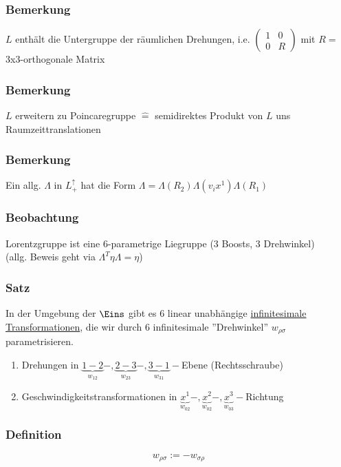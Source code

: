 \documentclass[twoside,a4paper]{scrartcl}
\renewcommand{\1}{\mathds{1}}
\newcommand{\entspricht}{\mathrel{\widehat{=}}}
\renewcommand{\L}{\Lambda}
\begin{document}
\subsubsection*{Bemerkung}
$L$ enthält die Untergruppe der räumlichen Drehungen, i.e. $\begin{pmatrix}1 & 0\\ 0 & R\end{pmatrix}$ mit $R=$3x3-orthogonale Matrix
\subsubsection*{Bemerkung}
$L$ erweitern zu Poincaregruppe $\entspricht$ semidirektes Produkt von $L$ uns Raumzeittranslationen
\subsubsection*{Bemerkung}
Ein allg. $\L$ in $L_+^\uparrow$ hat die Form $\L=\L(R_2)\L(v_ix^1)\L(R_1)$
\subsubsection*{Beobachtung}
Lorentzgruppe ist eine 6-parametrige Liegruppe (3 Boosts, 3 Drehwinkel)\\
(allg. Beweis geht via $\L^T \eta \L=\eta$)
\subsubsection*{Satz}
In der Umgebung der $\Eins$ gibt es 6 linear unabhängige \underline{infinitesimale Transformationen}, die wir durch 6 infinitesimale ''Drehwinkel'' $w_{\rho\sigma}$ parametrisieren.
\begin{enumerate}
\item Drehungen in $\underbrace{1-2}_{w_{12}}-,\underbrace{2-3}_{w_{23}}-,\underbrace{3-1}_{w_{31}}-$Ebene (Rechtsschraube)
\item Geschwindigkeitstransformationen in $\underbrace{x^1}_{w_{02}}-,\underbrace{x^2}_{w_{02}}-,\underbrace{x^3}_{w_{03}}-$Richtung
\end{enumerate}
\subsubsection*{Definition}
$$w_{\rho\sigma}:=-w_{\sigma\rho}$$
\end{document}
